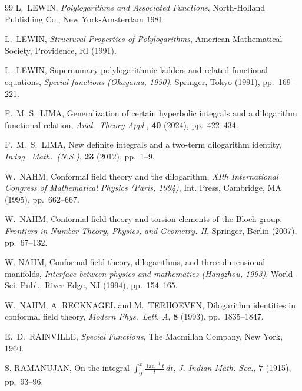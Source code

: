\documentclass[12pt]{article}
\begin{document}
\begin{thebibliography}{99}
 L.\ LEWIN, 
 \emph{Polylogarithms and Associated Functions}, 
 North-Holland Publishing Co., New York-Amsterdam 1981. 

 L.\ LEWIN, 
 \emph{Structural Properties of Polylogarithms}, 
 American Mathematical Society, Providence, RI (1991). 

 L.\ LEWIN, 
 Supernumary polylogarithmic ladders and related functional equations, 
 \textit{Special functions ({O}kayama, 1990)}, 
 Springer, Tokyo (1991), pp.\ 169--221. 

 F.\ M. S.\ LIMA, 
 Generalization of certain hyperbolic integrals and a dilogarithm functional relation, 
 \textit{Anal.\ Theory Appl.}, \textbf{40} (2024), pp.\ 422--434. 

 F.\ M.\ S.\ LIMA, 
 New definite integrals and a two-term dilogarithm identity, 
 \textit{Indag.\ Math.\ (N.S.)}, \textbf{23} (2012), pp.\ 1--9. 

 W.\ NAHM, 
 Conformal field theory and the dilogarithm, 
 \textit{X{I}th {I}nternational {C}ongress of {M}athematical {P}hysics ({P}aris, 1994)}, 
 Int. Press, Cambridge, MA (1995), pp.\ 662--667. 

 W.\ NAHM, 
 Conformal field theory and torsion elements of the {B}loch group, 
 \textit{Frontiers in Number Theory, Physics, and Geometry. {II}}, 
 Springer, Berlin (2007), pp.\ 67--132. 

 W. NAHM, 
 Conformal field theory, dilogarithms, and three-dimensional manifolds, 
 \textit{Interface between physics and mathematics ({H}angzhou, 1993)}, 
 World Sci. Publ., River Edge, NJ (1994), pp.\ 154--165. 

 W.\ NAHM, A. RECKNAGEL and M.\ TERHOEVEN, 
 Dilogarithm identities in conformal field theory, 
 \textit{Modern Phys.\ Lett. A}, \textbf{8} (1993), pp.\ 1835--1847. 

 E.\ D.\ RAINVILLE, 
 \textit{Special Functions}, 
 The Macmillan Company, New York, 1960. 

 S. RAMANUJAN, 
 On the integral $\int_{0}^{x} \frac{\tan^{-1} t}{t} \, dt$, 
 \textit{J. Indian Math. Soc.}, \textbf{7} (1915), pp.\ 93--96. 


\end{thebibliography}
\end{document}
